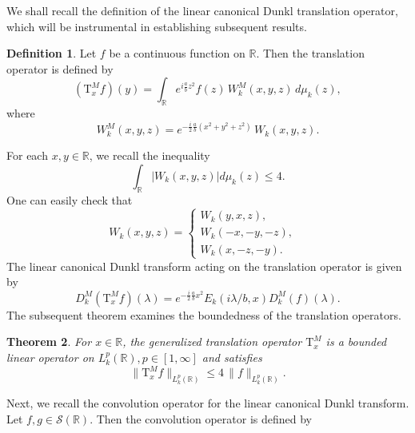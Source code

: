\documentclass[12pt,a4paper,reqno]{amsproc}
\newtheorem{theorem}{Theorem}[section]
\theoremstyle{definition}
\newtheorem{definition}[theorem]{Definition}
\theoremstyle{remark}
\numberwithin{equation}{section}
\newcommand{\Tau}{\mathrm{T}}
\begin{document}
We shall recall the definition of the linear canonical Dunkl translation operator, which will be instrumental in establishing subsequent results.
\begin{definition} \cite{USK}
Let $f$ be a continuous function on $\mathbb{R}$. Then the translation operator is defined by
\begin{equation*}
 (\Tau^M_xf)(y)=  \int_{\mathbb{R}}e^{i\frac{a}{b}z^2}f(z)\,W^M_{k}(x,y,z)\,d\mu_k(z), 
\end{equation*}
where
\begin{equation*}
W^M_{k}(x,y,z) = e^{-\frac{i}{2}\frac{a}{b}(x^2+y^2+z^2)}\,W_{k}(x,y,z).    
\end{equation*}
\end{definition}
For each  $x,y \in \mathbb{R}$, we recall the inequality \cite{soltani2004lp}
\begin{equation} \label{C7-e2.2}
     \int_{\mathbb{R}}|W_k(x,y,z)|  d \mu_k(z) \le 4. 
     \end{equation}
One can easily check that \cite{soltani2004lp}
\begin{equation}
    W_k(x,y,z) =
\left \{
\begin{array}{lll}
 W_k(y,x,z), & \mbox{}\\
 W_k (-x,-y,-z),& \mbox{}\\
 W_{k}(x,-z,-y) . & \mbox{}
\end{array}  \right. \label{C7-eq: 2.2}
\end{equation} 
The linear canonical Dunkl transform acting on the translation operator is
given by
\begin{equation}\label{C7-e:2.2}
 D^M_{k}(\Tau^M_xf)(\lambda) =e^{-\frac{i}{2}\frac{a}{b}x^2} E_{k}(i\lambda/b,x)D^M_{k}(f)(\lambda).  \end{equation}
 The subsequent theorem examines the boundedness of the translation operators.
\begin{theorem}\label{C7-T :3.5} \cite{USK}
For $x\in \mathbb{R}$, the generalized translation operator $\Tau^M_x$ is a bounded linear operator on $L^p_{k}(\mathbb{R}), p \in [1,\infty]$ and satisfies
\begin{equation*}
 \|\Tau^M_xf\|_{L^{p}_{k} (\mathbb{R})} \le 4\,\|f\|_{L^{p}_{k} (\mathbb{R})}.
\end{equation*}
\end{theorem}
Next, we recall the convolution operator for the linear canonical Dunkl transform.\\
Let $f,g \in \mathcal{S}(\mathbb{R})$. Then the convolution operator is defined by 
\end{document}
